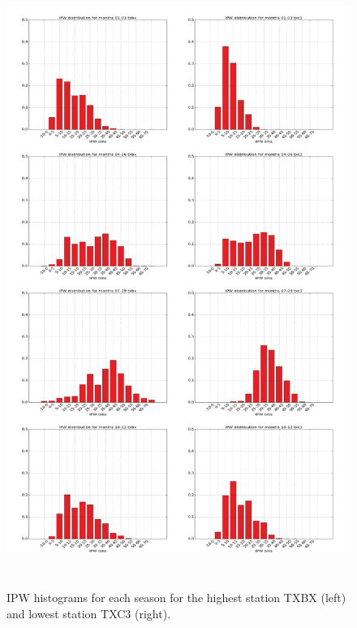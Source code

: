 \documentclass[proposal]{umassthesis}
\begin{document}
{\begin{figure}[!t]
\begin{center}
\includegraphics[width = 16cm,height = 20cm]{IPW_site_dist}
\caption{IPW histograms for each season for the highest station TXBX (left) and lowest station TXC3 (right).}
\label{fig:IPW_site_dist}
\end{center}
\end{figure}

}
\end{document}
